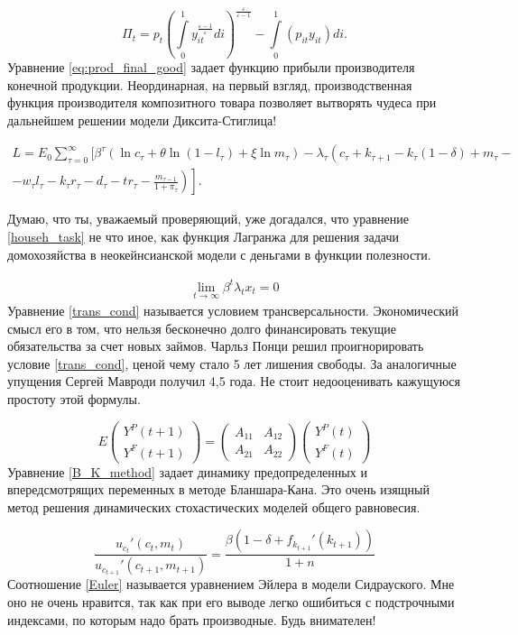 \documentclass[12pt, a4paper]{article}
\begin{document}
\begin{equation} \label{eq:prod_final_good}
\Pi_t=p_t\left(\int\limits_0^1 y_{it}^\frac{\varepsilon-1}{\varepsilon}di\right)^\frac{\varepsilon}{\varepsilon-1}-\int\limits_0^1 (p_{it} y_{it})di. \tag{ææ}
\end{equation}
Уравнение \ref{eq:prod_final_good} задает функцию прибыли производителя конечной продукции. Неординарная, на первый взгляд, производственная функция производителя композитного товара позволяет вытворять чудеса при дальнейшем решении модели Диксита-Стиглица!

\begin{multline} \label{househ_task}
L = E_0 \sum_{\tau=0}^\infty [ \beta^\tau (\ln c_\tau + \theta\ln (1-l_\tau)+\xi\ln m_\tau) -\lambda_\tau \left(c_\tau+k_{\tau+1}-k_\tau(1-\delta)+m_\tau-\right. \\ \left. \left.-w_\tau l_\tau-k_\tau r_\tau-d_\tau-tr_\tau-\frac{m_ {\tau-1}}{1+\pi_\tau}\right)\right]. \tag{æææ}
\end{multline}

Думаю, что ты, уважаемый проверяющий, уже догадался, что уравнение \ref{househ_task} не что иное, как функция Лагранжа для решения задачи домохозяйства в неокейнсианской модели с деньгами в функции полезности.

\begin{align} \label{trans_cond}
\lim\limits_{t\to\infty}\beta^t\lambda_tx_t=0 \tag{ææææ}
\end{align}
Уравнение \ref{trans_cond} называется условием трансверсальности. Экономический смысл его в том, что нельзя бесконечно долго финансировать текущие обязательства за счет новых займов. Чарльз Понци решил проигнорировать условие \ref{trans_cond}, ценой чему стало 5 лет лишения свободы. За аналогичные упущения Сергей Мавроди получил 4,5 года. Не стоит недооценивать кажущуюся простоту этой формулы.

\begin{equation} \label{B_K_method}
E\left(\begin{matrix}
Y^P(t+1)\\
Y^F(t+1)
\end{matrix}\right)=\left(\begin{matrix}
A_{11} & A_{12}\\
A_{21} & A_{22}
\end{matrix}\right)
\left(\begin{matrix}
Y^P(t)\\
Y^F(t)
\end{matrix} \right) \tag{æææææ}
\end{equation}
Уравнение \ref{B_K_method} задает динамику предопределенных и впередсмотрящих переменных в методе Бланшара-Кана. Это очень изящный метод решения динамических стохастических моделей общего равновесия.

\begin{equation} \label{Euler}
\frac{u_{c_t}'(c_t,m_t)}{u_{c_{t+1}}'(c_{t+1},m_{t+1})}=\frac{\beta (1-\delta+f_{k_{t+1}}'(k_{t+1}))}{1+n} \tag{ææææææ}
\end{equation}
Соотношение \ref{Euler} называется уравнением Эйлера в модели Сидрауского. Мне оно не очень нравится, так как при его выводе легко ошибиться с подстрочными индексами, по которым надо брать производные. Будь внимателен!
\end{document}
